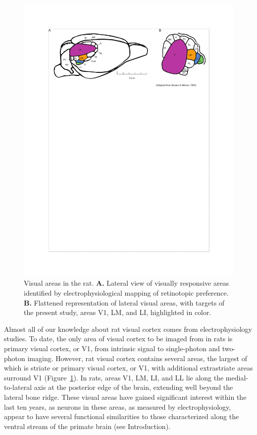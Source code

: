 \begin{figure}[t!]
    \includegraphics[width=\textwidth]{figures/chapter_2/fig_2-1_rat_visual_areas/fig_2-1_rat_visual_areas.pdf}
    \vspace{.1in}
    \caption[Visual areas in the rat]{Visual areas in the rat. \textbf{A.} Lateral view of visually responsive areas identified by electrophysiological mapping of retinotopic preference. \textbf{B.} Flattened representation of lateral visual areas, with targets of the present study, areas V1, LM, and LI, highlighted in color. 
    \label{fig:rat_visual_areas}}
\end{figure}

Almost all of our knowledge about rat visual cortex comes from electrophysiology studies. To date, the only area of visual cortex to be imaged from in rats is primary visual cortex, or V1, from intrinsic signal \cite{Gias2004} to single-photon \cite{Scott2018ImagingMacroscope} and two-photon \cite{Ohki2005, Greenberg2008} imaging. However, rat visual cortex contains several areas, the largest of which is striate or primary visual cortex, or V1, with additional extrastriate areas surround V1 \cite{Espinoza1983RetinotopicRat, Sereno1991} (Figure~\ref{fig:rat_visual_areas}). In rats, areas V1, LM, LI, and LL lie along the medial-to-lateral axis at the posterior edge of the brain, extending well beyond the lateral bone ridge. These visual areas have gained significant interest within the last ten years, as neurons in these areas, as measured by electrophysiology, appear to have several functional similarities to those characterized along the ventral stream of the primate brain (see Introduction). 

